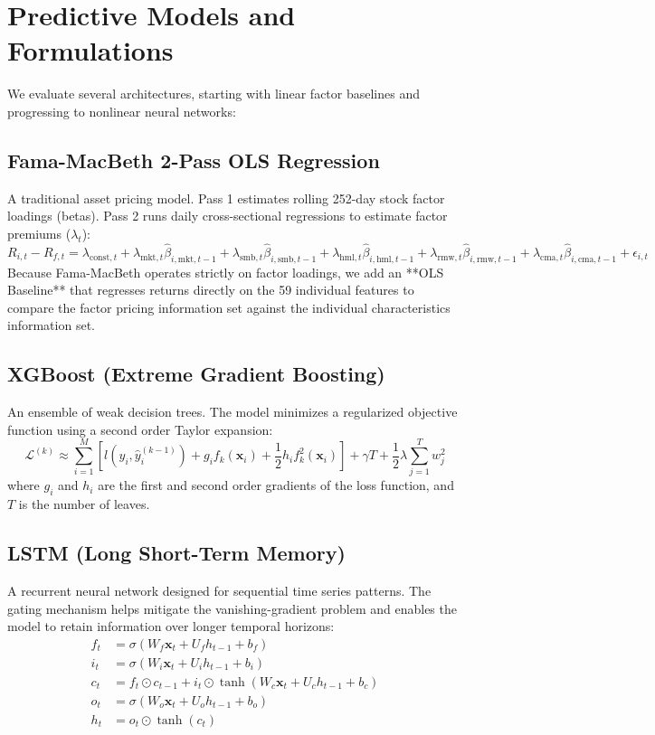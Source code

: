 \documentclass[11pt]{article}
\begin{document}
\section{Predictive Models and Formulations}
We evaluate several architectures, starting with linear factor baselines and progressing to nonlinear neural networks:

\subsection{Fama-MacBeth 2-Pass OLS Regression}
A traditional asset pricing model. Pass 1 estimates rolling 252-day stock factor loadings (betas). Pass 2 runs daily cross-sectional regressions to estimate factor premiums ($\lambda_t$):
\begin{equation}
    R_{i,t} - R_{f,t} = \lambda_{\text{const},t} + \lambda_{\text{mkt},t} \hat{\beta}_{i,\text{mkt},t-1} + \lambda_{\text{smb},t} \hat{\beta}_{i,\text{smb},t-1} + \lambda_{\text{hml},t} \hat{\beta}_{i,\text{hml},t-1} + \lambda_{\text{rmw},t} \hat{\beta}_{i,\text{rmw},t-1} + \lambda_{\text{cma},t} \hat{\beta}_{i,\text{cma},t-1} + \epsilon_{i,t}
\end{equation}
Because Fama-MacBeth operates strictly on factor loadings, we add an **OLS Baseline** that regresses returns directly on the 59 individual features to compare the factor pricing information set against the individual characteristics information set.

\subsection{XGBoost (Extreme Gradient Boosting)}
An ensemble of weak decision trees. The model minimizes a regularized objective function using a second order Taylor expansion:
\begin{equation}
    \mathcal{L}^{(k)} \approx \sum_{i=1}^{M} \left[ l(y_i, \hat{y}_i^{(k-1)}) + g_i f_k(\mathbf{x}_i) + \frac{1}{2} h_i f_k^2(\mathbf{x}_i) \right] + \gamma T + \frac{1}{2}\lambda \sum_{j=1}^{T} w_j^2
\end{equation}
where $g_i$ and $h_i$ are the first and second order gradients of the loss function, and $T$ is the number of leaves.

\subsection{LSTM (Long Short-Term Memory)}
A recurrent neural network designed for sequential time series patterns. The gating mechanism helps mitigate the vanishing-gradient problem and enables the model to retain information over longer temporal horizons:
\begin{align}
    f_t &= \sigma(W_f \mathbf{x}_t + U_f h_{t-1} + b_f) \\
    i_t &= \sigma(W_i \mathbf{x}_t + U_i h_{t-1} + b_i) \\
    c_t &= f_t \odot c_{t-1} + i_t \odot \tanh(W_c \mathbf{x}_t + U_c h_{t-1} + b_c) \\
    o_t &= \sigma(W_o \mathbf{x}_t + U_o h_{t-1} + b_o) \\
    h_t &= o_t \odot \tanh(c_t)
\end{align}
\end{document}
